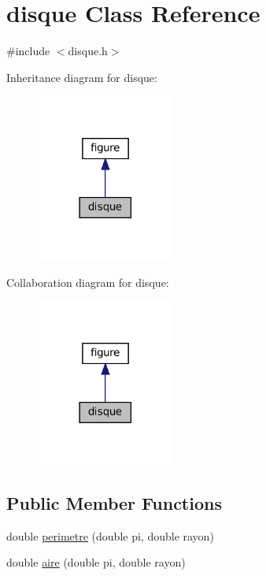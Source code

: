 \hypertarget{classdisque}{}\section{disque Class Reference}
\label{classdisque}


{\ttfamily \#include $<$disque.\+h$>$}



Inheritance diagram for disque\+:
\nopagebreak
\begin{figure}[H]
\begin{center}
\leavevmode
\includegraphics[width=129pt]{classdisque__inherit__graph}
\end{center}
\end{figure}


Collaboration diagram for disque\+:
\nopagebreak
\begin{figure}[H]
\begin{center}
\leavevmode
\includegraphics[width=129pt]{classdisque__coll__graph}
\end{center}
\end{figure}
\subsection*{Public Member Functions}
\begin{DoxyCompactItemize}
\item 
double \hyperlink{classdisque_a050ca11b1180244c645b4122a8a675a5}{perimetre} (double pi, double rayon)
\item 
double \hyperlink{classdisque_a2b62779089ca6d996789f5cb63f0b6a1}{aire} (double pi, double rayon)
\end{DoxyCompactItemize}


